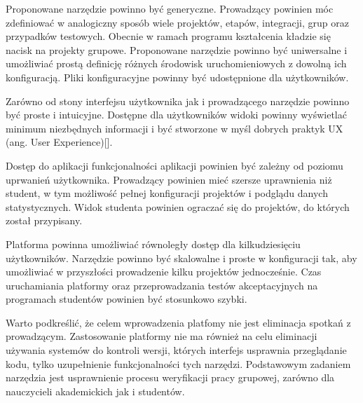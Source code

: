 Proponowane narzędzie powinno być generyczne.
Prowadzący powinien móc zdefiniować w analogiczny sposób wiele projektów, etapów, integracji, grup oraz przypadków testowych.
Obecnie w ramach programu kształcenia kładzie się nacisk na projekty grupowe.
Proponowane narzędzie powinno być uniwersalne i umożliwiać prostą definicję różnych środowisk uruchomieniowych z dowolną ich konfiguracją.
Pliki konfiguracyjne powinny być udostępnione dla użytkowników.

Zarówno od stony interfejsu użytkownika jak i prowadzącego narzędzie powinno być proste i intuicyjne.
Dostępne dla użytkowników widoki powinny wyświetlać minimum niezbędnych informacji i być stworzone w myśl dobrych praktyk UX (ang. User Experience)[].

Dostęp do aplikacji funkcjonalności aplikacji powinien być zależny od poziomu uprwanień użytkownika.
Prowadzący powinien mieć szersze uprawnienia niż student, w tym możliwość pełnej konfiguracji projektów i podglądu danych statystycznych.
Widok studenta powinien ograczać się do projektów, do których został przypisany.

Platforma powinna umożliwiać równoległy dostęp dla kilkudziesięciu użytkowników.
Narzędzie powinno być skalowalne i proste w konfiguracji tak, aby umożliwiać w przyszłości prowadzenie kilku projektów jednocześnie.
Czas uruchamiania platformy oraz przeprowadzania testów akceptacyjnych na programach studentów powinien być stosunkowo szybki.
 
Warto podkreślić, że celem wprowadzenia platfomy nie jest eliminacja spotkań z prowadzącym.
Zastosowanie platformy nie ma również na celu eliminacji używania systemów do kontroli wersji, których interfejs usprawnia przeglądanie kodu, tylko uzupełnienie funkcjonalności tych narzędzi.
Podstawowym zadaniem narzędzia jest usprawnienie procesu weryfikacji pracy grupowej, zarówno dla nauczycieli akademickich jak i studentów.	
	
